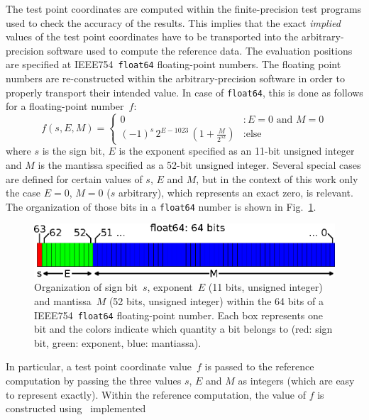 The test point coordinates are computed within the finite-precision test programs used to check the accuracy of the results.
This implies that the exact \textit{implied} values of the test point coordinates have to be transported
into the arbitrary-precision software used to compute the reference data.
The evaluation positions are specified at IEEE754~\texttt{float64} floating-point numbers.
The floating point numbers are re-constructed within the arbitrary-precision software
in order to properly transport their intended value.
In case of \texttt{float64}, this is done as follows for a floating-point number~$f$:
\begin{equation}
 f(s, E, M) =
 \begin{cases}
   0                                                             &: E=0 \textrm{ and } M=0 \\
   (-1)^s \, 2^{E - 1023} \, \left( 1 + \frac{M}{2^{52}} \right) &: \textrm{else}
  \end{cases} \label{eqn:float64}
\end{equation}
where $s$ is the sign bit, $E$ is the exponent specified as an 11-bit unsigned integer
and $M$ is the mantissa specified as a 52-bit unsigned integer.
Several special cases are defined for certain values of $s$, $E$ and $M$,
but in the context of this work only the case $E=0$, $M=0$ ($s$ arbitrary),
which represents an exact zero, is relevant.
The organization of those bits in a \texttt{float64} number is shown in Fig.~\ref{fig:float64}.
\begin{figure}[htbp]
 \centering
 \includegraphics{img/IEEE754_float64.eps}
 \caption{Organization of sign bit~$s$, exponent~$E$ (11 bits, unsigned integer)
          and mantissa~$M$ (52 bits, unsigned integer) within the 64 bits
          of a IEEE754~\texttt{float64} floating-point number.
          Each box represents one bit and the colors indicate which quantity a bit belongs to
          (red: sign bit, green: exponent, blue: mantiassa).}
 \label{fig:float64}
\end{figure}
In particular, a test point coordinate value~$f$ is passed to the reference computation
by passing the three values $s$, $E$ and $M$ as integers (which are easy to represent exactly).
Within the reference computation, the value of $f$ is constructed using~ implemented

